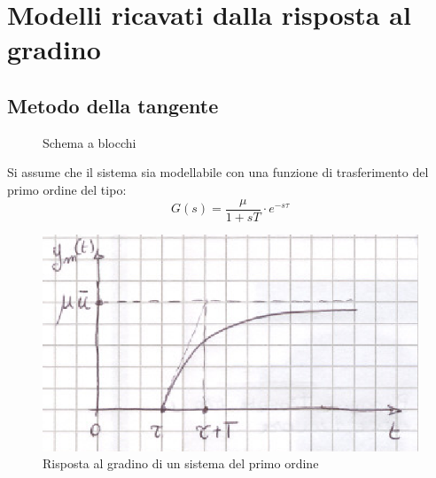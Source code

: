 \documentclass[a4paper]{report}
\begin{document}
\chapter{Modelli ricavati dalla risposta al gradino}
\section{Metodo della tangente}
\begin{figure}[!hbp]
  \center
  \caption{Schema a blocchi}
  \label{fig:schemaABlocchi}
\end{figure}
Si assume che il sistema sia modellabile con una funzione di
trasferimento del primo ordine del tipo:
\[
G(s) = \dfrac{\mu}{1 + sT} \cdot e^{-s\tau}
\]
\begin{figure}[!hbp]
  \begin{center}
    \includegraphics[scale=0.5]{./figures/metodoTangente01.png}
    \caption{Risposta al gradino di un sistema del primo ordine}
    \label{fig:rispostaGradino1Ordine}
  \end{center}
\end{figure}
\end{document}

